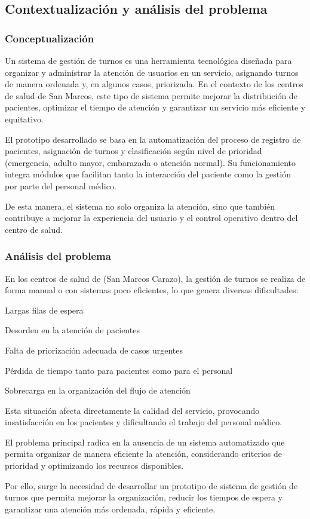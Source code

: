 \subsection{Contextualización y análisis del problema}

\subsubsection{Conceptualización}

Un sistema de gestión de turnos es una herramienta tecnológica diseñada para organizar y administrar la atención de usuarios en un servicio, asignando turnos de manera ordenada y, en algunos casos, priorizada. En el contexto de los centros de salud de San Marcos, este tipo de sistema permite mejorar la distribución de pacientes, optimizar el tiempo de atención y garantizar un servicio más eficiente y equitativo.

El prototipo desarrollado se basa en la automatización del proceso de registro de pacientes, asignación de turnos y clasificación según nivel de prioridad (emergencia, adulto mayor, embarazada o atención normal). Su funcionamiento integra módulos que facilitan tanto la interacción del paciente como la gestión por parte del personal médico.

De esta manera, el sistema no solo organiza la atención, sino que también contribuye a mejorar la experiencia del usuario y el control operativo dentro del centro de salud.

\subsubsection{Análisis del problema}

En los centros de salud de (San Marcos Carazo), la gestión de turnos se realiza de forma manual o con sistemas poco eficientes, lo que genera diversas dificultades:

Largas filas de espera

Desorden en la atención de pacientes

Falta de priorización adecuada de casos urgentes

Pérdida de tiempo tanto para pacientes como para el personal

Sobrecarga en la organización del flujo de atención

Esta situación afecta directamente la calidad del servicio, provocando insatisfacción en los pacientes y dificultando el trabajo del personal médico.

El problema principal radica en la ausencia de un sistema automatizado que permita organizar de manera eficiente la atención, considerando criterios de prioridad y optimizando los recursos disponibles.

Por ello, surge la necesidad de desarrollar un prototipo de sistema de gestión de turnos que permita mejorar la organización, reducir los tiempos de espera y garantizar una atención más ordenada, rápida y eficiente.
